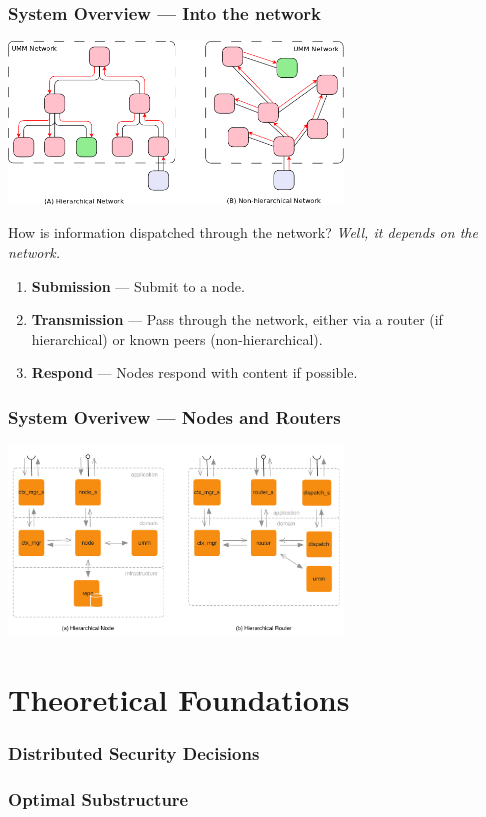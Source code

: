 \documentclass[t,handout, 10pt]{beamer}
\begin{document}
\begin{frame}
\frametitle{System Overview --- Into the network}
\centerline{\includegraphics[width=3.5in]{node-hierarchy}}
How is information dispatched through the network? {\it Well, it depends on the network.}
\pause
{\small
\begin{enumerate}
\item {\bf Submission} --- Submit to a node.
\item {\bf Transmission} --- Pass through the network, either via a router (if hierarchical) or known peers (non-hierarchical).
\item {\bf Respond} --- Nodes respond with content if possible.
\end{enumerate}
}
\end{frame}

\begin{frame}
\frametitle{System Overivew --- Nodes and Routers}
\centerline{\includegraphics[width=3.5in]{router-node-view}}
\end{frame}

\section{Theoretical Foundations}
\begin{frame}
\frametitle{Distributed Security Decisions}
\end{frame}

\begin{frame}
\frametitle{Optimal Substructure}
\end{frame}
\end{document}
